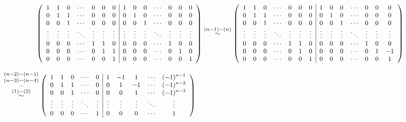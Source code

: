 \documentclass[a4paper,12pt]{article} %
\begin{document}
\begin{align*}\small
	\left(
		\begin{array}{ccccccc|ccccccc}
		1&1&0&\cdots&0&0&0					&1&0&0&\cdots&0&0&0\\
		0&1&1&\cdots&0&0&0    				&0&1&0&\cdots&0&0&0\\
		0&0&1&\cdots&0&0&0					&0&0&1&\cdots&0&0&0\\
		\vdots&\vdots&\vdots&\ddots&\vdots&\vdots&\vdots
		&\vdots&\vdots&\vdots&\ddots&\vdots&\vdots&\vdots\\
		0&0&0&\cdots&1&1&0     				&0&0&0&\cdots&1&0&0\\
		0&0&0&\cdots&0&1&1					&0&0&0&\cdots&0&1&0\\
		0&0&0&\cdots&0&0&1					&0&0&0&\cdots&0&0&1\\
		\end{array}
	\right)
	\stackrel{(n-1)-(n)}{\sim}
	\left(
	\begin{array}{ccccccc|ccccccc}
	1&1&0&\cdots&0&0&0					&1&0&0&\cdots&0&0&0\\
	0&1&1&\cdots&0&0&0    				&0&1&0&\cdots&0&0&0\\
	0&0&1&\cdots&0&0&0					&0&0&1&\cdots&0&0&0\\
	\vdots&\vdots&\vdots&\ddots&\vdots&\vdots&\vdots
	&\vdots&\vdots&\vdots&\ddots&\vdots&\vdots&\vdots\\
	0&0&0&\cdots&1&1&0     				&0&0&0&\cdots&1&0&0\\
	0&0&0&\cdots&0&1&0					&0&0&0&\cdots&0&1&-1\\
	0&0&0&\cdots&0&0&1					&0&0&0&\cdots&0&0&1\\
	\end{array}
	\right)
\end{align*}

$\small
	\stackrel{(n-2)-(n-1)}{\stackrel{(n-3)-(n-4)}{\stackrel{\cdots}{\stackrel{(1)-(2)}{\sim}}}}
	\left(
	\begin{array}{ccccc|ccccc}
	1&1&0&\cdots&0					&1&-1&1&\cdots&(-1)^{n-1}\\
	0&1&1&\cdots&0    				&0&1&-1&\cdots&(-1)^{n-2}\\
	0&0&1&\cdots&0					&0&0&1&\cdots&(-1)^{n-3}\\
	\vdots&\vdots&\vdots&\ddots&\vdots&\vdots&\vdots
	&\vdots&\ddots&\vdots\\
	0&0&0&\cdots&1     				&0&0&0&\cdots&1\\
	\end{array}
	\right)
$\\\\
\end{document}
